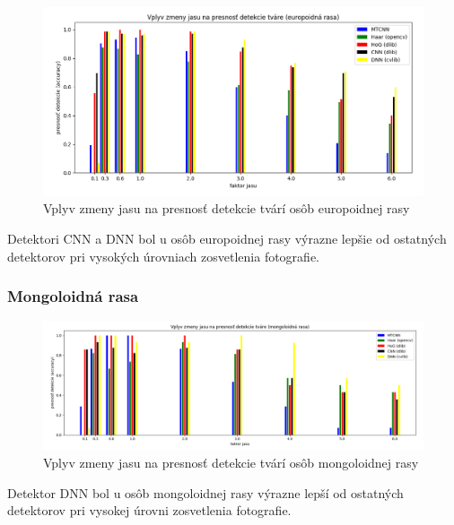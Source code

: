 \documentclass[]{article}
\begin{document}
	\begin{figure}[h!]
		\includegraphics[width=\textwidth]{Vysledky_jas/europ/Figure_1.png}
		\caption{Vplyv zmeny jasu na presnosť detekcie tvárí osôb europoidnej rasy}
	\end{figure}

	Detektori CNN a DNN bol u osôb europoidnej rasy výrazne lepšie od ostatných detektorov pri vysokých úrovniach zosvetlenia fotografie.

	\subsubsection*{Mongoloidná rasa}
	\begin{figure}[h!]
		\includegraphics[width=\textwidth]{Vysledky_jas/mongo/Figure_1.png}
		\caption{Vplyv zmeny jasu na presnosť detekcie tvárí osôb mongoloidnej rasy}
	\end{figure}

	Detektor DNN bol u osôb mongoloidnej rasy výrazne lepší od ostatných detektorov pri vysokej úrovni zosvetlenia fotografie.

	\newpage
\end{document}
